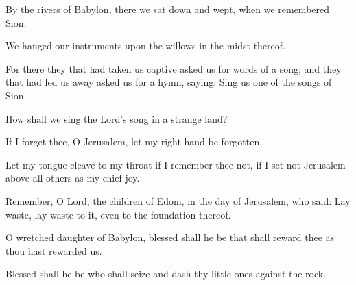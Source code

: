 By the rivers of Babylon, there we sat down and wept, when we remembered Sion.

We hanged our instruments upon the willows in the midst thereof.

For there they that had taken us captive asked us for words of a song; and they that had led us away asked us for a hymn, saying: Sing us one of the songs of Sion.

How shall we sing the Lord's song in a strange land?

If I forget thee, O Jerusalem, let my right hand be forgotten.

Let my tongue cleave to my throat if I remember thee not, if I set not Jerusalem above all others as my chief joy.

Remember, O Lord, the children of Edom, in the day of Jerusalem, who said: Lay waste, lay waste to it, even to the foundation thereof.

O wretched daughter of Babylon, blessed shall he be that shall reward thee as thou hast rewarded us.

Blessed shall he be who shall seize and dash thy little ones against the rock.
